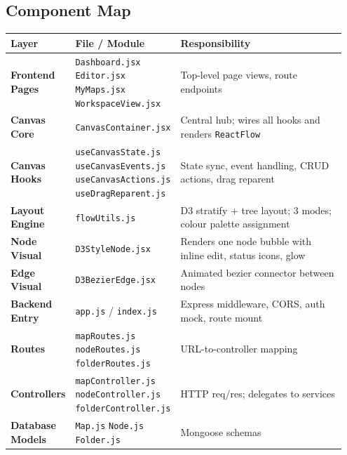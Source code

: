 \documentclass[12pt, a4paper]{article}
\begin{document}
\subsection{Component Map}
\begin{longtable}{>{\bfseries}p{0.18\linewidth} p{0.22\linewidth} p{0.55\linewidth}}
\toprule
Layer & File / Module & Responsibility \\ \midrule
\endfirsthead
Frontend Pages & \texttt{Dashboard.jsx} \newline \texttt{Editor.jsx} \newline \texttt{MyMaps.jsx} \newline \texttt{WorkspaceView.jsx} & Top-level page views, route endpoints \\
Canvas Core & \texttt{CanvasContainer.jsx} & Central hub; wires all hooks and renders \texttt{ReactFlow} \\
Canvas Hooks & \texttt{useCanvasState.js} \newline \texttt{useCanvasEvents.js} \newline \texttt{useCanvasActions.js} \newline \texttt{useDragReparent.js} & State sync, event handling, CRUD actions, drag reparent \\
Layout Engine & \texttt{flowUtils.js} & D3 stratify + tree layout; 3 modes; colour palette assignment \\
Node Visual & \texttt{D3StyleNode.jsx} & Renders one node bubble with inline edit, status icons, glow \\
Edge Visual & \texttt{D3BezierEdge.jsx} & Animated bezier connector between nodes \\
Backend Entry & \texttt{app.js} / \texttt{index.js} & Express middleware, CORS, auth mock, route mount \\
Routes & \texttt{mapRoutes.js} \newline \texttt{nodeRoutes.js} \newline \texttt{folderRoutes.js} & URL-to-controller mapping \\
Controllers & \texttt{mapController.js} \newline \texttt{nodeController.js} \newline \texttt{folderController.js} & HTTP req/res; delegates to services \\
Database Models & \texttt{Map.js} \newline \texttt{Node.js} \newline \texttt{Folder.js} & Mongoose schemas \\
\bottomrule
\end{longtable}
\end{document}
